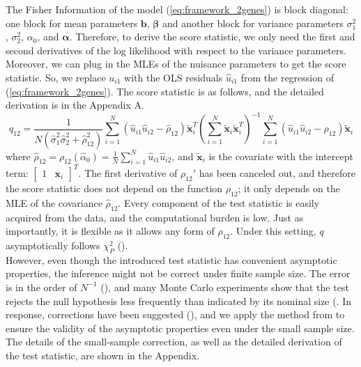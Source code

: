 \documentclass[aap,authoryear, preprint]{imsart}
\numberwithin{equation}{section}
\theoremstyle{plain}
\begin{document}
The Fisher Information of the model (\ref{eq:framework_2genes}) is block diagonal: one block for mean parameters $\bm{b}$, $\bm{\beta}$ and another block for variance parameters $\sigma_1^2$, $\sigma_2^2$, $\alpha_0$, and $\bm{\alpha}$. Therefore, to derive the score statistic, we only need the first and second derivatives of the log likelihood with respect to the variance parameters. Moreover, we can plug in the MLEs of the nuisance parameters to get the score statistic. So, we replace $u_{i1}$ with the OLS residuals $\hat{u}_{i1}$ from the regression of (\ref{eq:framework_2genes}). The score statistic is as follows, and the detailed derivation is in the Appendix A. 
\begin{equation}
    q_{12} = \frac{1}{N(\hat{\sigma}_1^2\hat{\sigma}_2^2+\hat{\rho}_{12}^2)}\sum_{i=1}^{N} (\hat{u}_{i1}\hat{u}_{i2}-\hat{\rho}_{12})\bm{\tilde{x}}_i^T (\sum_{i=1}^{N}\bm{\tilde{x}}_i \bm{\tilde{x}}_i^T)^{-1}
    \sum_{i=1}^{N} (\hat{u}_{i1}\hat{u}_{i2}-\hat{\rho}_{12})\bm{\tilde{x}}_i
    \label{eq:q}
\end{equation}
where $\hat{\rho}_{12} = \rho_{12}(\hat{\alpha}_0) = \frac{1}{N} \sum_{i=1}^{N} \hat{u}_{i1}\hat{u}_{i2}$, and $\bm{\tilde{x}}_i$ is the covariate with the intercept term: $\begin{bmatrix} 1 & \bm{x}_i \end{bmatrix}^T$. The first derivative of $\rho_{12}'$ has been canceled out, and therefore the score statistic does not depend on the function $\rho_{12}$; it only depends on the MLE of the covariance $\hat{\rho}_{12}$. Every component of the test statistic is easily acquired from the data, and the computational burden is low. Just as importantly, it is flexible as it allows any form of $\rho_{12}$. Under this setting, $q$ asymptotically follows $\chi_{P}^2$ (\cite{breusch1979simple}).\\

However, even though the introduced test statistic has convenient asymptotic properties, the inference might not be correct under finite sample size. The error is in the order of $N^{-1}$ (\cite{harris1985asymptotic}), and many Monte Carlo experiments show that the test rejects the null hypothesis less frequently than indicated by its nominal size (\cite{ godfrey1978testing, griffiths1986monte}. In response, corrections have been suggested (\cite{cribari2001monotonic, harris1985asymptotic}), and we apply the method from \cite{honda1988size} to ensure the validity of the asymptotic properties even under the small sample size. The details of the small-sample correction, as well as the detailed derivation of the test statistic, are shown in the Appendix.\\
\end{document}

